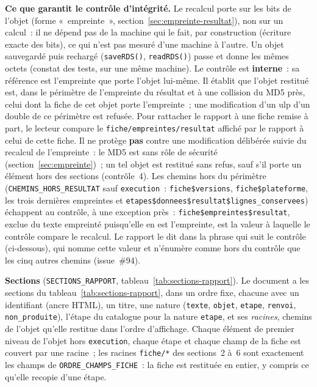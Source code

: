 \documentclass[a4paper,11pt]{article}
\newcommand{\code}[1]{\texttt{\small #1}}
\begin{document}
\medskip
\noindent
\textbf{Ce que garantit le contrôle d'intégrité.} Le recalcul porte sur les
bits de l'objet (forme «~empreinte~», section~\ref{sec:empreinte-resultat}),
non sur un calcul~: il ne dépend pas de la machine qui le fait, par
construction (écriture exacte des bits), ce qui n'est pas mesuré d'une
machine à l'autre. Un objet sauvegardé puis rechargé (\code{saveRDS()},
\code{readRDS()}) passe et donne les mêmes octets (constat des tests, sur
une même machine). Le contrôle est \textbf{interne}~: sa référence est
l'empreinte que porte l'objet lui-même. Il établit que l'objet restitué
est, dans le périmètre de l'empreinte du résultat et à une collision du MD5
près, celui dont la fiche de cet objet porte l'empreinte~; une
modification d'un ulp d'un double de ce périmètre est refusée. Pour
rattacher le rapport à une fiche remise à part, le lecteur compare le
\code{fiche/empreintes/resultat} affiché par le rapport à celui de cette
fiche. Il ne
protège \textbf{pas} contre une modification délibérée suivie du recalcul de
l'empreinte~: le MD5 est sans rôle de sécurité (section~\ref{sec:empreinte})~;
un tel objet est restitué sans refus, sauf s'il porte un élément hors des
sections (contrôle~4). Les chemins hors du périmètre
(\code{CHEMINS\_HORS\_RESULTAT} sauf \code{execution}~: \code{fiche\$versions},
\code{fiche\$plateforme}, les trois dernières empreintes et
\code{etapes\$donnees\$resultat\$}\allowbreak\code{lignes\_conservees}) échappent au
contrôle, à une exception près~: \code{fiche\$empreintes\$resultat}, exclue
du texte empreinté puisqu'elle en est l'empreinte, est la valeur à laquelle
le contrôle compare le recalcul. Le rapport le dit dans la phrase qui suit
le contrôle (ci-dessous), qui nomme cette valeur et n'énumère comme hors du
contrôle que les cinq autres chemins (issue~\#94).

\medskip
\noindent
\textbf{Sections} (\code{SECTIONS\_RAPPORT}, tableau~\ref{tab:sections-rapport}).
Le document a les sections du tableau~\ref{tab:sections-rapport}, dans un ordre fixe, chacune avec un
identifiant (ancre HTML), un titre, une nature (\code{texte}, \code{objet},
\code{etape}, \code{renvoi}, \code{non\_produite}), l'étape du catalogue pour
la nature \code{etape}, et ses \emph{racines}, chemins de l'objet qu'elle
restitue dans l'ordre d'affichage. Chaque élément de premier niveau de
l'objet hors \code{execution}, chaque étape et chaque champ de la fiche est
couvert par une racine~; les racines \code{fiche/*} des sections~2 à~6 sont
exactement les champs de \code{ORDRE\_CHAMPS\_FICHE}~: la fiche est
restituée en entier, y compris ce qu'elle recopie d'une étape.
\end{document}
